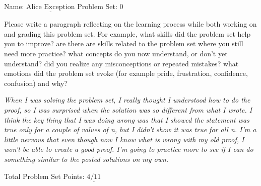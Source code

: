 \documentclass[11pt]{article}
\begin{document}



\hfill Name: $\underline{\textrm{Alice Exception}}$\newline
{}\hfill Problem Set: $0$



\vspace{1cm}

Please write a paragraph reflecting on the learning process while both working on and grading this problem set. For example, what skills did the problem set help you to improve? are there are skills related to the problem set where you still need more practice? what concepts do you now understand, or don't yet understand? did you realize any misconceptions or repeated mistakes? what emotions did the problem set evoke (for example pride, frustration, confidence, confusion) and why?

\vspace{1cm}

\textit{When I was solving the problem set, I really thought I understood how to do the proof, so I was surprised when the solution was so different from what I wrote. I think the key thing that I was doing wrong was that I showed the statement was true only for a couple of values of n, but I didn't show it was true for all n. I'm a little nervous that even though now I know what is wrong with my old proof, I won't be able to create a good proof. I'm going to practice more to see if I can do something similar to the posted solutions on my own.}

\vspace{5cm}
\noindent Total Problem Set Points: $\underline{4/11}$ 
\end{document}
